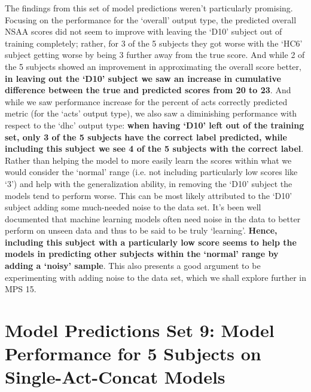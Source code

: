 \documentclass[12pt,twoside]{report}
\begin{document}
\quad 	The findings from this set of model predictions weren’t particularly promising. Focusing on the performance for the ‘overall’ output type, the predicted overall NSAA scores did not seem to improve with leaving the ‘D10’ subject out of training completely; rather, for 3 of the 5 subjects they got worse with the ‘HC6’ subject getting worse by being 3 further away from the true score. And while 2 of the 5 subjects showed an improvement in approximating the overall score better, \textbf{in leaving out the ‘D10’ subject we saw an increase in cumulative difference between the true and predicted scores from 20 to 23}. And while we saw performance increase for the percent of acts correctly predicted metric (for the ‘acts’ output type), we also saw a diminishing performance with respect to the ‘dhc’ output type: \textbf{when having ‘D10’ left out of the training set, only 3 of the 5 subjects have the correct label predicted, while including this subject we see 4 of the 5 subjects with the correct label}.\\

\quad Rather than helping the model to more easily learn the scores within what we would consider the ‘normal’ range (i.e. not including particularly low scores like ‘3’) and help with the generalization ability, in removing the ‘D10’ subject the models tend to perform worse. This can be most likely attributed to the ‘D10’ subject adding some much-needed noise to the data set. It’s been well documented that machine learning models often need noise in the data to better perform on unseen data and thus to be said to be truly ‘learning’. \textbf{Hence, including this subject with a particularly low score seems to help the models in predicting other subjects within the ‘normal’ range by adding a ‘noisy’ sample}. This also presents a good argument to be experimenting with adding noise to the data set, which we shall explore further in MPS 15.



\section{Model Predictions Set 9: Model Performance for 5 Subjects on Single-Act-Concat Models}
\end{document}
